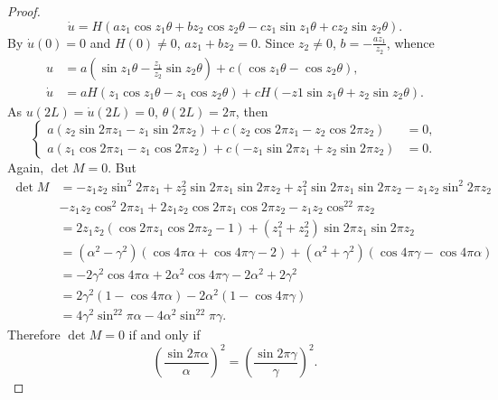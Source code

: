 \documentclass[11pt]{amsart}
\theoremstyle{definition}
\theoremstyle{remark}
\numberwithin{equation}{section}
\begin{document}
\begin{proof}
\begin{equation*}
\dot u=H\left(az_1\cos z_1\theta+bz_2\cos z_2\theta -c z_1\sin z_1\theta+cz_2\sin z_2\theta\right).
\end{equation*}
By $\dot u(0)=0$ and $H(0)\neq 0$, $az_1+bz_2=0$. Since $z_2\neq 0$, $b=-\frac{az_1}{z_2}$, whence
\begin{align*}
u&=a\left(\sin z_1\theta-\frac{z_1}{z_2}\sin z_2\theta\right)+c\left(\cos z_1\theta-\cos z_2\theta\right),\\
\dot u&=aH\left(z_1\cos z_1\theta-z_1\cos z_2\theta\right)+cH\left(-z1\sin z_1\theta+z_2\sin z_2\theta\right).
\end{align*}
As $u(2L)=\dot u(2L)=0$, $\theta(2L)=2\pi$, then 
\begin{equation*}
\begin{cases}
a\left(z_2\sin 2\pi z_1-z_1\sin 2\pi z_2\right)+c\left(z_2\cos 2\pi z_1-z_2\cos 2\pi z_2\right)&=0,\\
a\left(z_1\cos 2 \pi z_1-z_1\cos 2 \pi z_2\right)+c\left(-z_1\sin 2 \pi z_1+z_2\sin 2 \pi z_2\right)&=0.
\end{cases}
\end{equation*}
Again, $\det M=0$. But
\begin{equation*}
\begin{split}
\det M&=-z_1z_2\sin^2 2\pi z_1+z_2^2\sin 2\pi z_1\sin 2\pi z_2+z_1^2\sin 2\pi z_1\sin 2\pi z_2-z_1z_2\sin^2 2\pi z_2\\
&-z_1z_2 \cos^2 2\pi z_1+ 2z_1z_2\cos 2\pi z_1\cos 2 \pi z_2-z_1z_2\cos ^22\pi z_2\\
&=2z_1z_2\left (\cos 2\pi z_1\cos 2 \pi z_2-1\right)+ \left(z_1^2+z_2^2\right)\sin 2\pi z_1\sin 2\pi z_2\\
&=\left(\alpha^2-\gamma^2\right)\left(\cos 4\pi\alpha+\cos 4\pi\gamma-2\right)+\left(\alpha^2+\gamma^2\right)\left(\cos 4\pi\gamma-\cos 4\pi \alpha\right)\\
&=-2\gamma^2\cos 4\pi\alpha+2\alpha^2\cos 4\pi\gamma-2\alpha^2+2\gamma^2\\
&=2\gamma^2\left(1-\cos 4\pi\alpha\right)-2\alpha^2\left(1-\cos 4\pi\gamma\right)\\
&=4\gamma^2\sin^22\pi\alpha-4\alpha^2\sin^22\pi\gamma.
\end{split}
\end{equation*}
Therefore $\det M=0$ if and only if 
\begin{equation}\label{contrastart}
\left(\frac{\sin 2\pi\alpha}{\alpha}\right)^2=\left(\frac{\sin 2\pi\gamma}{\gamma}\right)^2.

\end{equation}
\end{proof}
\end{document}
